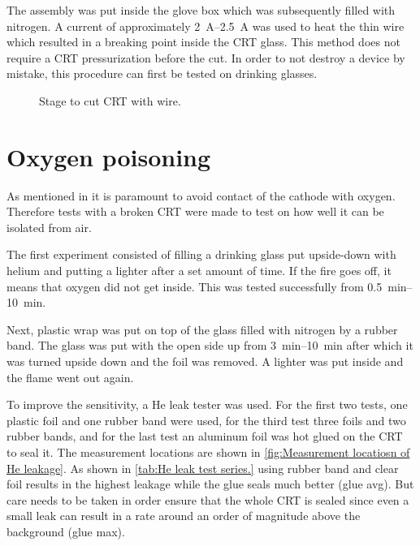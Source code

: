 The assembly was put inside the glove box which was subsequently filled with nitrogen. A current of approximately \SIrange{2}{2.5}{\ampere} was used to heat the thin wire which resulted in a breaking point inside the CRT glass. This method does not require a CRT pressurization before the cut. In order to not destroy a device by mistake, this procedure can first be tested on drinking glasses.

\begin{figure}[h]
	
	\caption{Stage to cut CRT with wire.}
	\label{fig:Stage to cut CRT with wire}
\end{figure}


\section{Oxygen poisoning}
\label{sec:Oxygen poisoning}


As mentioned in  it is paramount to avoid contact of the cathode with oxygen. Therefore tests with a broken CRT were made to test on how well it can be isolated from air.

The first experiment consisted of filling a drinking glass put upside-down with helium and putting a lighter after a set amount of time. If the fire goes off, it means that oxygen did not get inside. This was tested successfully from \SIrange{0.5}{10}{\minute}.

Next, plastic wrap was put on top of the glass filled with nitrogen by a rubber band. The glass was put with the open side up from \SIrange{3}{10}{\minute} after which it was turned upside down and the foil was removed. A lighter was put inside and the flame went out again.

To improve the sensitivity, a He leak tester was used. For the first two tests, one plastic foil and one rubber band were used, for the third test three foils and two rubber bands, and for the last test an aluminum foil was hot glued on the CRT to seal it. The measurement locations are shown in \cref{fig:Measurement locatiosn of He leakage}. As shown in \cref{tab:He leak test series.}  using rubber band and clear foil results in the highest leakage while the glue seals much better (glue avg). But care needs to be taken in order ensure that the whole CRT is sealed since even a small leak can result in a rate around an order of magnitude above the background (glue max).

